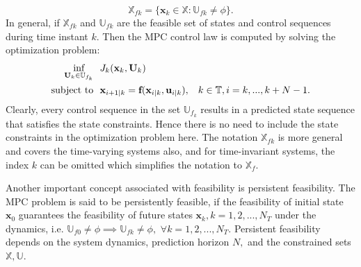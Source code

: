 \documentclass{article}
\begin{document}
\begin{equation}
 \mathbb{X}_{fk}=\{   \textbf{x}_{k}\in \mathbb{X}: \mathbb{U}_{fk} \neq \phi \}.
\end{equation} 
In general, if $\mathbb{X}_{fk}$ and $\mathbb{U}_{fk}$ are the feasible set of states and control sequences during time instant $k.$ Then the MPC control law is computed by solving the optimization problem:
\begin{equation}
 \begin{aligned}
\underset{\textbf{U}_{k}\in \mathbb{U}_{f_k}}{\text{inf}}  ~&~ J_{k}(\textbf{x}_{k},\textbf{U}_{k})\\
\text{subject to}
  ~&~ \textbf{x}_{i+1|k}=\textbf{f}(\textbf{x}_{i|k},\textbf{u}_{i|k}), \hspace{.3cm}k\in \mathbb{T}, i=k,...,k+N-1.
     \end{aligned}
\end{equation}
Clearly, every control sequence in the set $\mathbb{U}_{f_k}$ results in a predicted state sequence that satisfies the state constraints. Hence there is no need to include the state constraints in the optimization problem here. 
The notation $\mathbb{X}_{fk}$ is more general and covers the time-varying systems also, and for time-invariant systems, the index $k$ can be omitted which simplifies the notation to $\mathbb{X}_{f}.$
\par Another important concept associated with feasibility is persistent feasibility.
The MPC problem is said to be persistently feasible, if the feasibility of initial state $\textbf{x}_{0}$ guarantees the feasibility of future states $\textbf{x}_{k}, k=1,2,...,N_T$ under the dynamics, i.e. $\mathbb{U}_{f0}\neq \phi \implies \mathbb{U}_{fk} \neq \phi,$ $\forall k=1,2,...,N_{T}$. Persistent feasibility depends on the system dynamics, prediction horizon $N,$ and the constrained sets $\mathbb{X},\mathbb{U}$.
\end{document}
